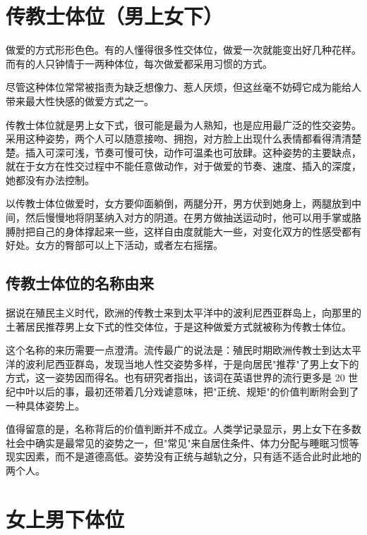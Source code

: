 \documentclass[12pt,UTF8]{ctexbook}
\begin{document}
\section{传教士体位（男上女下）}

做爱的方式形形色色。有的人懂得很多性交体位，做爱一次就能变出好几种花样。而有的人只钟情于一两种体位，每次做爱都采用习惯的方式。

尽管这种体位常常被指责为缺乏想像力、惹人厌烦，但这丝毫不妨碍它成为能给人带来最大性快感的做爱方式之一。

传教士体位就是男上女下式，很可能是最为人熟知，也是应用最广泛的性交姿势。采用这种姿势，两个人可以随意接吻、拥抱，对方脸上出现什么表情都看得清清楚楚。插入可深可浅，节奏可慢可快，动作可温柔也可放肆。这种姿势的主要缺点，就在于女方在性交过程中不能任意做动作，对于做爱的节奏、速度、插入的深度，她都没有办法控制。

以传教士体位做爱时，女方要仰面躺倒，两腿分开，男方伏到她身上，两腿放到中间，然后慢慢地将阴茎纳入对方的阴道。在男方做抽送运动时，他可以用手掌或胳膊肘把自己的身体撑起来一些，这样自由度就能大一些，对变化双方的性感受都有好处。女方的臀部可以上下活动，或者左右摇摆。

\vspace{0.5em}
\subsection{传教士体位的名称由来}

据说在殖民主义时代，欧洲的传教士来到太平洋中的波利尼西亚群岛上，向那里的土著居民推荐男上女下式的性交体位，于是这种做爱方式就被称为传教士体位。

\vspace{0.5em}

这个名称的来历需要一点澄清。流传最广的说法是：殖民时期欧洲传教士到达太平洋的波利尼西亚群岛，发现当地人性交姿势多样，于是向居民"推荐"了男上女下的方式，这一姿势因而得名。也有研究者指出，该词在英语世界的流行更多是 20 世纪中叶以后的事，最初还带着几分戏谑意味，把"正统、规矩"的价值判断附会到了一种具体姿势上。

值得留意的是，名称背后的价值判断并不成立。人类学记录显示，男上女下在多数社会中确实是最常见的姿势之一，但"常见"来自居住条件、体力分配与睡眠习惯等现实因素，而不是道德高低。姿势没有正统与越轨之分，只有适不适合此时此地的两个人。

\section{女上男下体位}
\end{document}
